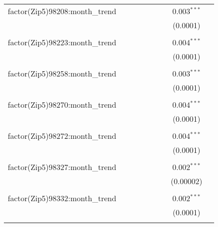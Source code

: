 \begin{table}[H]
{\begin{tabular}{@{\extracolsep{5pt}}lcccccccc}
  factor(Zip5)98208:month\_trend &  &  &  &  &  &  & 0.003$^{***}$ &  \\  

   &  &  &  &  &  &  & (0.0001) &  \\  

   & & & & & & & & \\  

  factor(Zip5)98223:month\_trend &  &  &  &  &  &  & 0.004$^{***}$ &  \\  

   &  &  &  &  &  &  & (0.0001) &  \\  

   & & & & & & & & \\  

  factor(Zip5)98258:month\_trend &  &  &  &  &  &  & 0.003$^{***}$ &  \\  

   &  &  &  &  &  &  & (0.0001) &  \\  

   & & & & & & & & \\  

  factor(Zip5)98270:month\_trend &  &  &  &  &  &  & 0.004$^{***}$ &  \\  

   &  &  &  &  &  &  & (0.0001) &  \\  

   & & & & & & & & \\  

  factor(Zip5)98272:month\_trend &  &  &  &  &  &  & 0.004$^{***}$ &  \\  

   &  &  &  &  &  &  & (0.0001) &  \\  

   & & & & & & & & \\  

  factor(Zip5)98327:month\_trend &  &  &  &  &  &  & 0.002$^{***}$ &  \\  

   &  &  &  &  &  &  & (0.00002) &  \\  

   & & & & & & & & \\  

  factor(Zip5)98332:month\_trend &  &  &  &  &  &  & 0.002$^{***}$ &  \\  

   &  &  &  &  &  &  & (0.0001) &  \\  

   & & & & & & & & \\  


\end{tabular}}
\end{table}
